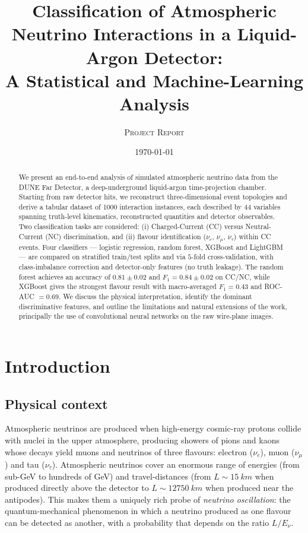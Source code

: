 \documentclass[11pt,a4paper]{article}
\title{\textbf{Classification of Atmospheric Neutrino Interactions in a Liquid-Argon Detector:\\ A Statistical and Machine-Learning Analysis}}
\author{\textsc{Project Report}}
\date{\today}
\begin{document}
\maketitle

\begin{abstract}
\noindent We present an end-to-end analysis of simulated atmospheric neutrino data from the DUNE Far Detector, a deep-underground liquid-argon time-projection chamber. Starting from raw detector hits, we reconstruct three-dimensional event topologies and derive a tabular dataset of \num{1000} interaction instances, each described by \num{44} variables spanning truth-level kinematics, reconstructed quantities and detector observables. Two classification tasks are considered: (i) Charged-Current (CC) versus Neutral-Current (NC) discrimination, and (ii) flavour identification ($\nu_e$, $\nu_\mu$, $\nu_\tau$) within CC events. Four classifiers --- logistic regression, random forest, XGBoost and LightGBM --- are compared on stratified train/test splits and via $5$-fold cross-validation, with class-imbalance correction and detector-only features (no truth leakage). The random forest achieves an accuracy of $0.81 \pm 0.02$ and $F_1=0.84 \pm 0.02$ on CC/NC, while XGBoost gives the strongest flavour result with macro-averaged $F_1=0.43$ and ROC-AUC $=0.69$. We discuss the physical interpretation, identify the dominant discriminative features, and outline the limitations and natural extensions of the work, principally the use of convolutional neural networks on the raw wire-plane images.
\end{abstract}

\section{Introduction}
\label{sec:intro}

\subsection{Physical context}
Atmospheric neutrinos are produced when high-energy cosmic-ray protons collide with nuclei in the upper atmosphere, producing showers of pions and kaons whose decays yield muons and neutrinos of three flavours: electron ($\nu_e$), muon ($\nu_\mu$) and tau ($\nu_\tau$).  Atmospheric neutrinos cover an enormous range of energies (from sub-GeV to hundreds of GeV) and travel-distances (from $L\sim\SI{15}{km}$ when produced directly above the detector to $L\sim\SI{12750}{km}$ when produced near the antipodes).  This makes them a uniquely rich probe of \emph{neutrino oscillation}: the quantum-mechanical phenomenon in which a neutrino produced as one flavour can be detected as another, with a probability that depends on the ratio $L/E_\nu$.
\end{document}
